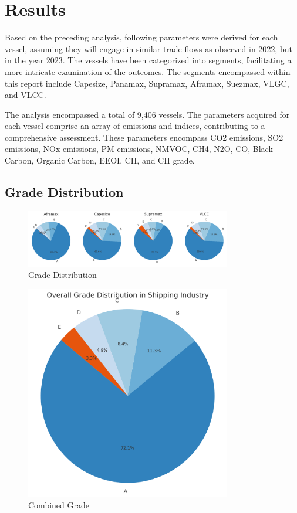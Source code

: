 \chapter{Results}

Based on the preceding analysis, following parameters were derived for each vessel, assuming they will engage in similar trade flows as observed in 2022, but in the year 2023. 
The vessels have been categorized into segments, facilitating a more intricate examination of the outcomes. The segments encompassed within this report include Capesize, Panamax, Supramax, Aframax, Suezmax, VLGC, and VLCC.

The analysis encompassed a total of 9,406 vessels. 
The parameters acquired for each vessel comprise an array of emissions and indices, contributing to a comprehensive assessment. 
These parameters encompass CO2 emissions, SO2 emissions, NOx emissions, PM emissions, NMVOC, CH4, N2O, CO, Black Carbon, Organic Carbon, EEOI, CII, and CII grade.

\section{Grade Distribution}

\begin{figure}[h]
    \centering
    \includegraphics[width=0.8\textwidth]{images/grade_distribution.png}
    \caption{Grade Distribution}
    \label{grade_distribution}
\end{figure}


\begin{figure}[h]
    \centering
    \includegraphics[width=0.8\textwidth]{images/combined_grade.png}
    \caption{Combined Grade}
    \label{combined_grade}
\end{figure}

